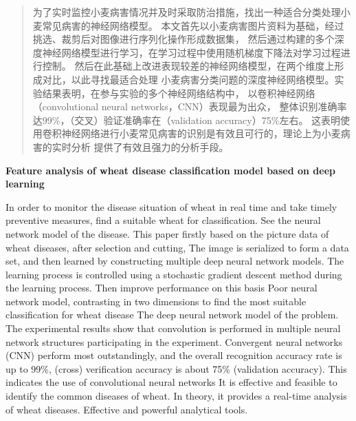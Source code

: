\begin{abstract}
    为了实时监控小麦病害情况并及时采取防治措施，找出一种适合分类处理小麦常见病害的神经网络模型。
    本文首先以小麦病害图片资料为基础，经过挑选、裁剪后对图像进行序列化操作形成数据集，
    然后通过构建的多个深度神经网络模型进行学习，在学习过程中使用随机梯度下降法对学习过程进行控制。
    然后在此基础上改进表现较差的神经网络模型，在两个维度上形成对比，以此寻找最适合处理
    小麦病害分类问题的深度神经网络模型。实验结果表明，在参与实验的多个神经网络结构中，
    以卷积神经网络（convolutional neural networks，CNN）表现最为出众，
    整体识别准确率达99\%，（交叉）验证准确率在（validation accuracy）75\%左右。
    这表明使用卷积神经网络进行小麦常见病害的识别是有效且可行的，理论上为小麦病害的实时分析
    提供了有效且强力的分析手段。

\end{abstract}
\newpage

\begin{center}
    \fontsize{18pt}{18pt}\textbf{Feature analysis of wheat disease classification model based on deep learning}
\end{center}
\begin{enabstract}
    In order to monitor the disease situation of wheat in real time and take timely preventive measures, find a suitable wheat for classification.
    See the neural network model of the disease. This paper firstly based on the picture data of wheat diseases, after selection and cutting,
    The image is serialized to form a data set, and then learned by constructing multiple deep neural network models.
    The learning process is controlled using a stochastic gradient descent method during the learning process. Then improve performance on this basis
    Poor neural network model, contrasting in two dimensions to find the most suitable classification for wheat disease
    The deep neural network model of the problem. The experimental results show that convolution is performed in multiple neural network structures participating in the experiment.
    Convergent neural networks (CNN) perform most outstandingly, and the overall recognition accuracy rate is up to
    99\%, (cross) verification accuracy is about 75\% (validation accuracy). This indicates the use of convolutional neural networks
    It is effective and feasible to identify the common diseases of wheat. In theory, it provides a real-time analysis of wheat diseases.
    Effective and powerful analytical tools.

\end{enabstract}
\newpage